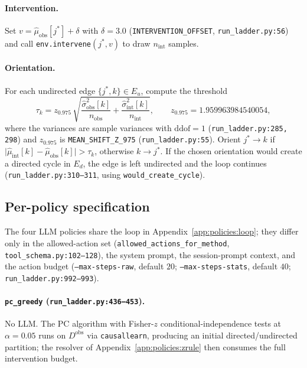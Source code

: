 \paragraph{Intervention.} Set $v = \hat\mu_{\text{obs}}[j^*] + \delta$ with $\delta = 3.0$ (\texttt{INTERVENTION\_OFFSET}, \texttt{run\_ladder.py:56}) and call \texttt{env.intervene}$(j^*, v)$ to draw $n_{\text{int}}$ samples.

\paragraph{Orientation.} For each undirected edge $\{j^*, k\} \in E_u$, compute the threshold
\begin{equation}
\tau_k = z_{0.975}\, \sqrt{\frac{\hat\sigma^2_{\text{obs}}[k]}{n_{\text{obs}}} + \frac{\hat\sigma^2_{\text{int}}[k]}{n_{\text{int}}}}, \qquad z_{0.975} = 1.959963984540054,
\end{equation}
where the variances are sample variances with $\mathrm{ddof} = 1$ (\texttt{run\_ladder.py:285, 298}) and $z_{0.975}$ is \texttt{MEAN\_SHIFT\_Z\_975} (\texttt{run\_ladder.py:55}). Orient $j^* \to k$ if $\lvert\hat\mu_{\text{int}}[k] - \hat\mu_{\text{obs}}[k]\rvert > \tau_k$, otherwise $k \to j^*$. If the chosen orientation would create a directed cycle in $E_d$, the edge is left undirected and the loop continues (\texttt{run\_ladder.py:310--311}, using \texttt{would\_create\_cycle}).

\subsection{Per-policy specification}
\label{app:policies:perpolicy}

The four LLM policies share the loop in Appendix~\ref{app:policies:loop}; they differ only in the allowed-action set (\texttt{allowed\_actions\_for\_method}, \texttt{tool\_schema.py:102--128}), the system prompt, the session-prompt context, and the action budget (\texttt{--max-steps-raw}, default $20$; \texttt{--max-steps-stats}, default $40$; \texttt{run\_ladder.py:992--993}).

\paragraph{\texttt{pc\_greedy} (\texttt{run\_ladder.py:436--453}).} No LLM. The PC algorithm with Fisher-$z$ conditional-independence tests at $\alpha = 0.05$ runs on $D^{\text{obs}}$ via \texttt{causallearn}, producing an initial directed/undirected partition; the resolver of Appendix~\ref{app:policies:zrule} then consumes the full intervention budget.

